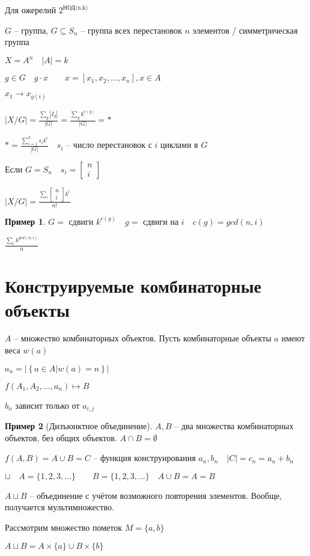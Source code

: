 \documentclass{book}
\renewcommand\O{\ensuremath{\emptyset}}
\theoremstyle{definition}
\newtheorem*{example}{Пример}
\begin{document}
Для ожерелий $2^{\text{НОД(n,k)}}$

$G$ -- группа,  $G\subseteq S_n$ -- группа всех перестановок $n$ элементов / симметрическая группа

 $X = A^n\quad |A| = k$

 $g\in G\quad g\cdot x\qquad x = [x_1, x_2, \ldots, x_n], x\in A$

 $x_1 \to x_{g\left( i \right) }$ 

 \begin{theorem}
 $\left| X / G \right| = \frac{\sum_g \left| I_g \right| }{|G|} = \frac{\sum_g k^{c(g)}}{|G|} =*$
 \end{theorem}

 $*= \frac{\sum_{i=1}^{n} s_ik^i}{|G|}\quad s_i$ -- число перестановок с $i$ циклами в  $G$

 Если $G = S_n\quad s_i = \begin{bmatrix} n\\i \end{bmatrix} $

 $\left| X / G \right|  = \frac{\sum_i \begin{bmatrix} n\\i \end{bmatrix}k^i }{n!}$

 \begin{example}
     $G=$ сдвиги  $k^{c(g)}\quad g = $ сдвиги на  $i\quad c(g) = gcd(n,i)$

     $\frac{\sum_i k^{gcd(n,i)}}{n}$
 \end{example}



\section{Конструируемые комбинаторные объекты}

$A$ -- множество комбинаторных объектов. Пусть комбинаторные объекты  $a$ имеют веса  $w(a)$

$a_n = |\left\{ a\in A| w(a) = n \right\} |$

$f(A_1, A_2, \ldots, a_n) \mapsto B$

$b_n$ зависит только от  $a_{i,j}$ 

\begin{example}
    [Дизъюнктное объединение]

    $A, B$ -- два множества комбинаторных объектов, без общих объектов.  $A\cap B=\O $

    $f(A,B) = A\cup B = C$ -- функция конструирования $a_n, b_n\quad |C| = c_n = a_n+b_n$ 

    $\sqcup\quad A = \{1, 2, 3, \ldots\}\qquad B = \{1, 2, 3, \ldots\}\quad A\cup B = A = B$ 

    $A \sqcup B$ -- объединение с учётом возможного повторения элементов. Вообще, получается мультимножество. 

    Рассмотрим множество пометок  $M = \{a,b\}$

    $A\sqcup B = A\times \{a\} \cup B\times \{b\}$
\end{example}
\end{document}
